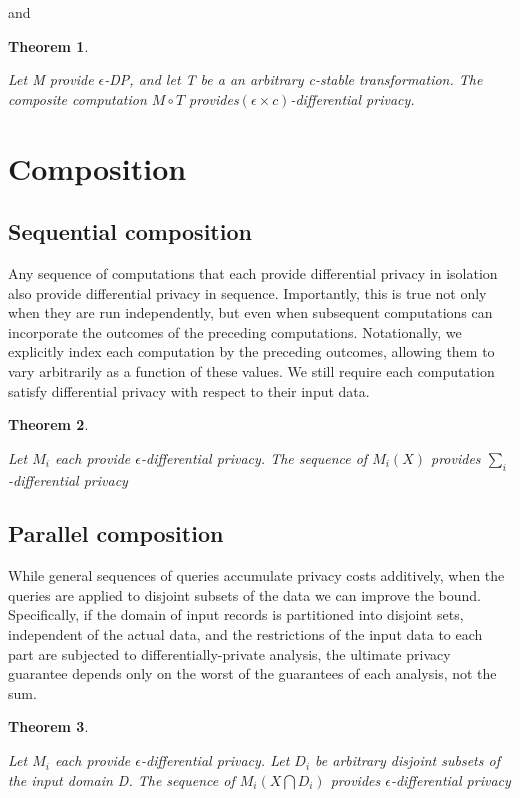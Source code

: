 \documentclass{article}
\newtheorem{thm}{Theorem}[section]
\newenvironment{theorem}{\begin{thm}\begin{rm}}%
{\end{rm}\end{thm}}
\begin{document}
and 
\begin{theorem}
Let M provide $\epsilon$-DP, and let T be a an arbitrary c-stable transformation. The composite computation $M \circ T$ provides$(\epsilon \times c)$-differential privacy. 
\end{theorem}

\section{Composition}

\subsection{Sequential composition}
Any sequence of computations that each provide differential
privacy in isolation also provide differential privacy in sequence.
Importantly, this is true not only when they are run
independently, but even when subsequent computations can
incorporate the outcomes of the preceding computations.
Notationally, we explicitly index each computation by the
preceding outcomes, allowing them to vary arbitrarily as a
function of these values. We still require each computation
satisfy differential privacy with respect to their input data.

\begin{theorem}
Let $M_i$ each provide $\epsilon$-differential privacy.
The sequence of $M_i(X)$ provides $\sum\limits_{i}$-differential privacy
\end{theorem}

\subsection{Parallel composition}
While general sequences of queries accumulate privacy
costs additively, when the queries are applied to disjoint subsets
of the data we can improve the bound. Specifically, if
the domain of input records is partitioned into disjoint sets,
independent of the actual data, and the restrictions of the
input data to each part are subjected to differentially-private
analysis, the ultimate privacy guarantee depends only on the
worst of the guarantees of each analysis, not the sum.

\begin{theorem}
Let $M_i$ each provide $\epsilon$-differential privacy.
Let $D_i$ be arbitrary disjoint subsets of the input domain D.
The sequence of $M_i(X \bigcap D_i)$ provides $\epsilon$-differential privacy
\end{theorem}





%
%
\end{document}
